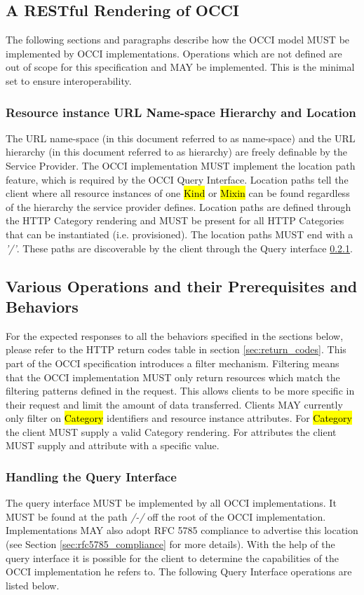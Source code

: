 \documentclass[10pt,a4paper]{article}
\begin{document}
\subsection{A RESTful Rendering of OCCI}
The following sections and paragraphs describe how the OCCI model MUST
be implemented by OCCI implementations. Operations which are not
defined are out of scope for this specification and MAY be implemented. 
This is the minimal set to ensure interoperability.

\subsubsection{Resource instance URL Name-space Hierarchy and Location}

The URL name-space (in this document referred to as name-space) and
the URL hierarchy (in this document referred to as hierarchy) are freely
definable by the Service Provider. The OCCI implementation MUST
implement the location path feature, which is required by the OCCI
Query Interface. Location paths tell the client where all resource
instances of one \hl{Kind} or \hl{Mixin} can be found regardless of
the hierarchy the service provider defines. Location paths are defined
through the HTTP Category rendering and MUST be present for all HTTP
Categories that can be instantiated (i.e. provisioned). The location
paths MUST end with a \emph{'/'}. These paths are discoverable by the
client through the Query interface \ref{sec:query}.

\subsection{Various Operations and their Prerequisites and Behaviors}
\label{sec:behaviours}
For the expected responses to all the behaviors specified in the
sections below, please refer to the HTTP return codes table in section
\ref{sec:return_codes}. This part of the OCCI specification introduces
a filter mechanism. Filtering means that the OCCI implementation MUST
only return resources which match the filtering patterns defined in
the request. This allows clients to be more specific in their request
and limit the amount of data transferred. Clients MAY currently only
filter on \hl{Category} identifiers and resource instance attributes. For
\hl{Category} the client MUST supply a valid Category rendering. For
attributes the client MUST supply and attribute with a specific value.

\subsubsection{Handling the Query Interface}
\label{sec:query}
The query interface MUST be implemented by all OCCI
implementations. It MUST be found at the path \emph{/-/} off the root
of the OCCI implementation. Implementations MAY also adopt RFC 5785
\cite{rfc5785} compliance to advertise this location (see Section
\ref{sec:rfc5785_compliance} for more details).  With the help of the
query interface it is possible for the client to determine the
capabilities of the OCCI implementation he refers to. The following
Query Interface operations are listed below.
\end{document}
